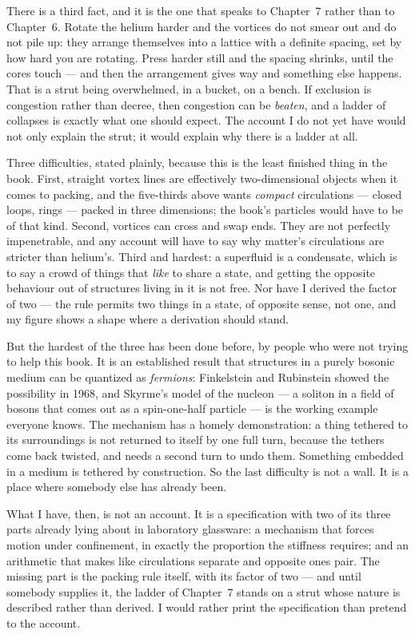 There is a third fact, and it is the one that speaks to Chapter~7 rather than to Chapter~6. Rotate the helium harder and the vortices do not smear out and do not pile up: they arrange themselves into a lattice with a definite spacing, set by how hard you are rotating. Press harder still and the spacing shrinks, until the cores touch --- and then the arrangement gives way and something else happens. That is a strut being overwhelmed, in a bucket, on a bench. If exclusion is congestion rather than decree, then congestion can be \emph{beaten}, and a ladder of collapses is exactly what one should expect. The account I do not yet have would not only explain the strut; it would explain why there is a ladder at all.

Three difficulties, stated plainly, because this is the least finished thing in the book. First, straight vortex lines are effectively two-dimensional objects when it comes to packing, and the five-thirds above wants \emph{compact} circulations --- closed loops, rings --- packed in three dimensions; the book's particles would have to be of that kind. Second, vortices can cross and swap ends. They are not perfectly impenetrable, and any account will have to say why matter's circulations are stricter than helium's. Third and hardest: a superfluid is a condensate, which is to say a crowd of things that \emph{like} to share a state, and getting the opposite behaviour out of structures living in it is not free. Nor have I derived the factor of two --- the rule permits two things in a state, of opposite sense, not one, and my figure shows a shape where a derivation should stand.

But the hardest of the three has been done before, by people who were not trying to help this book. It is an established result that structures in a purely bosonic medium can be quantized as \emph{fermions}: Finkelstein and Rubinstein showed the possibility in 1968, and Skyrme's model of the nucleon --- a soliton in a field of bosons that comes out as a spin-one-half particle --- is the working example everyone knows. The mechanism has a homely demonstration: a thing tethered to its surroundings is not returned to itself by one full turn, because the tethers come back twisted, and needs a second turn to undo them. Something embedded in a medium is tethered by construction. So the last difficulty is not a wall. It is a place where somebody else has already been.

What I have, then, is not an account. It is a specification with two of its three parts already lying about in laboratory glassware: a mechanism that forces motion under confinement, in exactly the proportion the stiffness requires; and an arithmetic that makes like circulations separate and opposite ones pair. The missing part is the packing rule itself, with its factor of two --- and until somebody supplies it, the ladder of Chapter~7 stands on a strut whose nature is described rather than derived. I would rather print the specification than pretend to the account.


